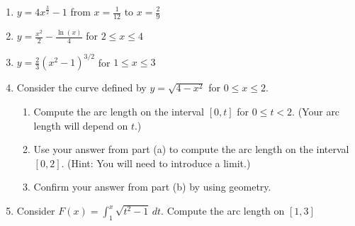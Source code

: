 \documentclass[12pt]{article}
\newif\ifans
\begin{document}
\begin{enumerate}

\item $y=4x^{\frac{3}{2}}-1$ from $x=\frac{1}{12}$ to $x=\frac{2}{9}$ 

\ifans{\fbox{$\frac{19}{54}$}} \fi

\item $y = \frac{x^2}{2} - \frac{\ln(x)}{4}$ for $2 \leq x \leq 4$ 

\ifans{\fbox{$6+\frac{1}{4}\ln{2}$; Detailed Solution: \textcolor{blue}{\href{http://www.math.drexel.edu/classes/Calculus/resources/Math122HW/Solutions/122_09_Arc_Length_02.pdf}{Here}}}} \fi

\item $y=\frac{2}{3}(x^2-1)^{3/2}$ for $1\leq x \leq 3$ 

\ifans{\fbox{$\frac{46}{3}$}} \fi

\item Consider the curve defined by $y = \sqrt{4-x^2}$ for $0 \leq x \leq 2$.

\begin{enumerate}

\item Compute the arc length on the interval $[0,t]$ for $0 \leq t <2$. (Your arc length will depend on $t$.)

\ifans{\fbox{$2\sin^{-1}{\left(\frac{t}{2}\right)}$}} \fi

\item Use your answer from part (a) to compute the arc length on the interval $[0,2]$. (Hint: You will need to introduce a limit.)

\ifans{\fbox{$\pi$}} \fi

\item Confirm your answer from part (b) by using geometry.

\ifans{\fbox{\parbox{1\linewidth}{On the interval $[0,2]$, the curve is $\frac{1}{4}$ of a circle with a radius of 2.  So, the length should be $\frac{1}{4}$  of the circumference; that is, $\text{Length} = \left.\frac{1}{4} \cdot 2 \pi r \right|_{r=2}= \frac{1}{4} \cdot 2 \pi (2) = \pi$.}}} \fi

\end{enumerate}

\item Consider $F(x)=\int_1^x \sqrt{t^2-1} \,dt$.  Compute the arc length on $[1,3]$

\ifans{\fbox{4; Detailed Solution: \textcolor{blue}{\href{http://www.math.drexel.edu/classes/Calculus/resources/Math122HW/Solutions/122_09_Arc_Length_05.pdf}{Here}}}} \fi


\end{enumerate}
\end{document}
